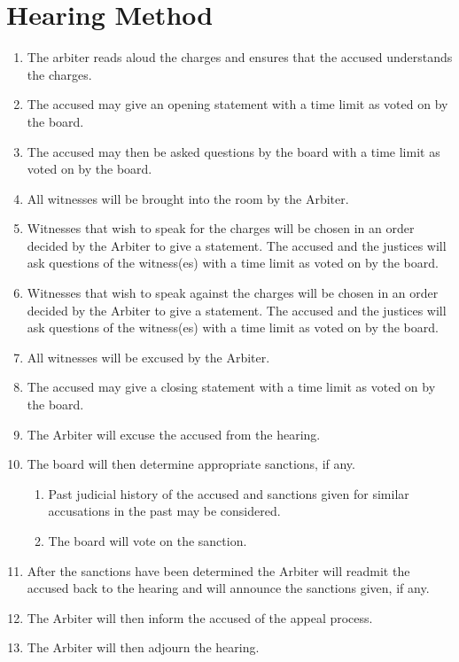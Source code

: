 \section{Hearing Method}
	\begin{enumerate}
		\item The arbiter reads aloud the charges and ensures that the accused understands the charges.
		\item The accused may give an opening statement with a time limit as voted on by the board.
		\item The accused may then be asked questions by the board with a time limit as voted on by the board.
		\item All witnesses will be brought into the room by the Arbiter.
		\item Witnesses that wish to speak for the charges will be chosen in an order decided by the Arbiter to give a statement. The accused and the justices will ask questions of the witness(es) with a time limit as voted on by the board.
		\item Witnesses that wish to speak against the charges will be chosen in an order decided by the Arbiter to give a statement. The accused and the justices will ask questions of the witness(es) with a time limit as voted on by the board.
		\item All witnesses will be excused by the Arbiter.
		\item The accused may give a closing statement with a time limit as voted on by the board.
		\item The Arbiter will excuse the accused from the hearing.
		\item The board will then determine appropriate sanctions, if any.
			\begin{enumerate}
				\item Past judicial history of the accused and sanctions given for similar accusations in the past may be considered.	
				\item The board will vote on the sanction.
			\end{enumerate}
		\item After the sanctions have been determined the Arbiter will readmit the accused back to the hearing and will announce the sanctions given, if any.
		\item The Arbiter will then inform the accused of the appeal process.
		\item The Arbiter will then adjourn the hearing.
	\end{enumerate}

